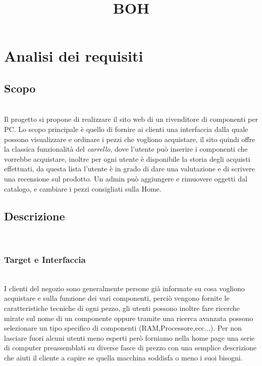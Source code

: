 \documentclass[a4paper,12pt]{article}
\begin{document}
\title{BOH}
\tableofcontents
\newpage
\section{Analisi dei requisiti}%
\subsection{Scopo} \mbox{} \\
Il progetto si propone di realizzare il sito web di un rivenditore di componenti per PC.
Lo scopo principale è quello di fornire ai clienti una interfaccia dalla quale possono visualizzare e ordinare i pezzi che vogliono acquistare, il sito quindi offre la classica funzionalità del \emph{carrello}, dove l'utente può inserire i componenti che vorrebbe acquistare, inoltre per ogni utente è disponibile la storia degli acquisti effettuati, da questa lista l'utente è in grado di dare una valutazione e di scrivere una recensione sul prodotto.
Un admin può aggiungere e rimuovere oggetti dal catalogo, e cambiare i pezzi consigliati sulla Home.
\subsection{Descrizione} \mbox{} \\
\subsubsection{Target e Interfaccia} \mbox{} \\
I clienti del negozio sono generalmente persone già informate su cosa vogliono acquistare e sulla funzione dei vari componenti, perciò vengono fornite le caratteristiche tecniche di ogni pezzo, gli utenti possono inoltre fare ricerche mirate sul nome di un componente oppure tramite una ricerca avanzata possono selezionare un tipo specifico di componenti (RAM,Processore,ecc...).
Per non lasciare fuori alcuni utenti meno esperti però forniamo nella home page una serie di computer preassemblati su diverse fasce di prezzo con una semplice descrizione che aiuti il cliente a capire se quella macchina soddisfa o meno i suoi bisogni.
\end{document}
